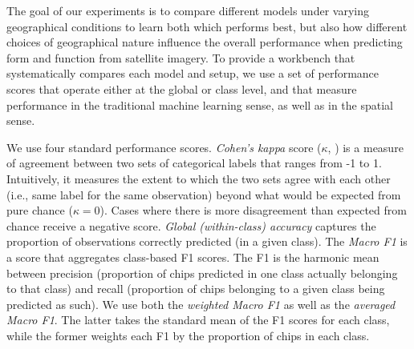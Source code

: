 The goal of our experiments is to compare different models under varying
geographical conditions to learn both which performs best, but also how
different choices of geographical nature influence the overall performance
when predicting form and function from satellite imagery.
To provide a workbench that systematically compares each model and setup, we
use a set of performance scores that operate either at the global or class level,
and that measure performance in the traditional machine learning sense, as
well as in the spatial sense.

We use four standard performance scores. \textit{Cohen's kappa} score ($\kappa$,
\citealp{cohen1960coefficient}) is a measure of agreement between two sets of
categorical labels that ranges from -1 to 1. Intuitively, it measures the
extent to which the two sets agree with each other (i.e., same label for the
same observation) beyond what would be expected from pure chance
($\kappa=0$). Cases where there is more disagreement than expected from chance
receive a negative score. \textit{Global (within-class) accuracy} captures the
proportion of observations correctly predicted (in a given class). The
\textit{Macro F1} is a score that aggregates class-based F1
scores. The F1 is the harmonic mean between precision (proportion of
chips predicted in one class actually belonging to that class) and recall
(proportion of chips belonging to a given class being predicted as such).
We use both the \textit{weighted Macro F1} as well as the \textit{averaged
Macro F1}. The latter takes the standard mean of the F1 scores for each class,
while the former weights each F1 by the proportion of chips in each class.

